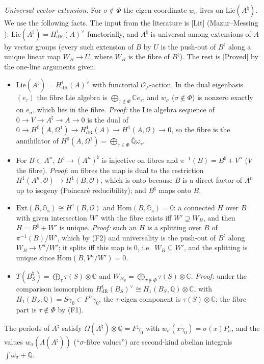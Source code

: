 \documentclass[11pt]{amsart}
\theoremstyle{definition}
\newcommand{\Qb}{\overline{\mathbb{Q}}}
\newcommand{\C}{\mathbb{C}}
\newcommand{\Q}{\mathbb{Q}}
\newcommand{\Ga}{\mathbb{G}_{\mathrm a}}
\newcommand{\lab}[1]{\textup{[#1]}}
\begin{document}
\smallskip
\noindent\emph{Universal vector extension.} For $\sigma\notin\Phi$ the eigen-coordinate $w_\sigma$ lives on
$\mathrm{Lie}(A^\natural)$. We use the following facts. The input from the literature is \lab{Lit} (Mazur--Messing
\cite{MM74}): $\mathrm{Lie}(A^\natural)=H^1_{\mathrm{dR}}(A)^\vee$ functorially, and $A^\natural$ is universal among
extensions of $A$ by vector groups (every such extension of $B$ by $U$ is the push-out of $B^\natural$ along a unique linear
map $W_B\to U$, where $W_B$ is the fibre of $B^\natural$). The rest is \lab{Proved} by the one-line arguments given.
\begin{itemize}
\item[(F1)] $\mathrm{Lie}(A^\natural)=H^1_{\mathrm{dR}}(A)^\vee$ with functorial $\mathcal O_F$-action. In the dual eigenbasis
$(e_\tau)$ the fibre Lie algebra is $\bigoplus_{\tau\notin\Phi}\C e_\tau$, and $w_\sigma$ ($\sigma\notin\Phi$) is nonzero
exactly on $e_\sigma$, which lies in the fibre. \emph{Proof:} the Lie algebra sequence of $0\to V\to A^\natural\to A\to0$
is the dual of $0\to H^0(A,\Omega^1)\to H^1_{\mathrm{dR}}(A)\to H^1(A,\mathcal O)\to0$, so the fibre is the annihilator
of $H^0(A,\Omega^1)=\bigoplus_{\tau\in\Phi}\Qb\omega_\tau$.
\item[(F2)] For $B\subset A^n$, $B^\natural\to(A^n)^\natural$ is injective on fibres and $\pi^{-1}(B)=B^\natural+V^n$ ($V$ the
fibre). \emph{Proof:} on fibres the map is dual to the restriction $H^1(A^n,\mathcal O)\to H^1(B,\mathcal O)$, which is
onto because $B$ is a direct factor of $A^n$ up to isogeny (Poincar\'e reducibility); and $B^\natural$ maps onto $B$.
\item[(F3)] $\mathrm{Ext}(B,\Ga)\cong H^1(B,\mathcal O)$ and $\mathrm{Hom}(B,\Ga)=0$: a connected $H$ over $B$ with given
intersection $W'$ with the fibre exists iff $W'\supseteq W_B$, and then $H=B^\natural+W'$ is unique. \emph{Proof:} such
an $H$ is a splitting over $B$ of $\pi^{-1}(B)/W'$, which by (F2) and universality is the push-out of $B^\natural$ along
$W_B\to V^n/W'$; it splits iff this map is $0$, i.e.\ $W_B\subseteq W'$, and the splitting is unique since
$\mathrm{Hom}(B,V^n/W')=0$.
\item[(F4)] $T(B_S^\natural)=\bigoplus_\tau\tau(S)\otimes\C$ and $W_{B_S}=\bigoplus_{\tau\notin\Phi}\tau(S)\otimes\C$.
\emph{Proof:} under the comparison isomorphism $H^1_{\mathrm{dR}}(B_S)^\vee\cong H_1(B_S,\Q)\otimes\C$, with
$H_1(B_S,\Q)=S\gamma_0\subset F^n\gamma_0$, the $\tau$-eigen component is $\tau(S)\otimes\C$; the fibre part is $\tau\notin\Phi$
by (F1).
\end{itemize}
The periods of $A^\natural$ satisfy $\Omega(A^\natural)\otimes\Q=F\tilde\gamma_0$ with $w_\sigma(x\tilde\gamma_0)=\sigma(x)P_\sigma$,
and the values $w_\sigma(\Lambda(A^\natural))$ (``$\sigma$-fibre values'') are second-kind abelian integrals
$\int\omega_\sigma+\Qb$.
\end{document}
